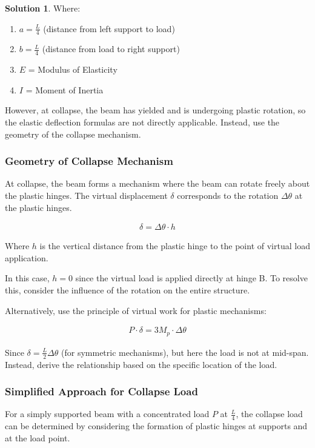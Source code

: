 \documentclass[12pt]{article}
\theoremstyle{definition} %
\newtheorem{solution}{Solution}
\theoremstyle{plain} %
\begin{document}
\begin{solution}
Where:
\begin{enumerate}
    \item $ a = \frac{L}{4} $ (distance from left support to load)
    \item $ b = \frac{L}{4} $ (distance from load to right support)
    \item $ E $ = Modulus of Elasticity
    \item $ I $ = Moment of Inertia
\end{enumerate}

However, at collapse, the beam has yielded and is undergoing plastic rotation, so the elastic deflection formulas are not directly applicable. Instead, use the geometry of the collapse mechanism.

\subsubsection*{Geometry of Collapse Mechanism}

At collapse, the beam forms a mechanism where the beam can rotate freely about the plastic hinges. The virtual displacement $ \delta $ corresponds to the rotation $ \Delta \theta $ at the plastic hinges.

\begin{align}
\delta = \Delta \theta \cdot h
\end{align}

Where $ h $ is the vertical distance from the plastic hinge to the point of virtual load application.

In this case, $ h = 0 $ since the virtual load is applied directly at hinge B. To resolve this, consider the influence of the rotation on the entire structure.

Alternatively, use the principle of virtual work for plastic mechanisms:

\begin{align}
P \cdot \delta = 3 M_p \cdot \Delta \theta
\end{align}

Since $ \delta = \frac{L}{2} \Delta \theta $ (for symmetric mechanisms), but here the load is not at mid-span. Instead, derive the relationship based on the specific location of the load.

\subsubsection*{Simplified Approach for Collapse Load}

For a simply supported beam with a concentrated load $ P $ at $ \frac{L}{4} $, the collapse load can be determined by considering the formation of plastic hinges at supports and at the load point.


\end{solution}
\end{document}
